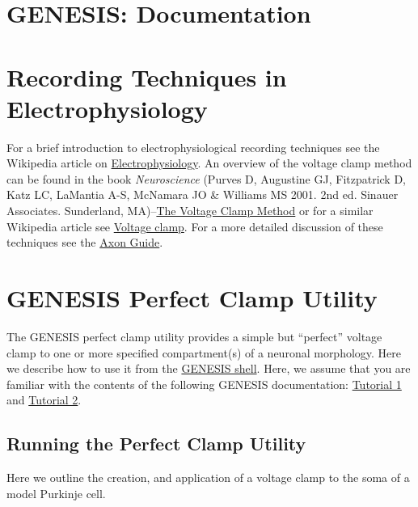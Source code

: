 \documentclass[12pt]{article}
\begin{document}
\section*{GENESIS: Documentation}

\section*{Recording Techniques in Electrophysiology}

For a brief introduction to electrophysiological recording techniques see the Wikipedia article on \href{http://en.wikipedia.org/wiki/Electrophysiology#Current_clamp}{Electrophysiology}. An overview of the voltage clamp method can be found in the book {\it Neuroscience} (Purves D, Augustine GJ,  Fitzpatrick D, Katz LC, LaMantia A-S, McNamara JO \& Williams MS 2001. 2nd ed. Sinauer Associates. Sunderland, MA)--\href{http://www.ncbi.nlm.nih.gov/books/bv.fcgi?rid=neurosci.box.174}{The Voltage Clamp Method} or for a similar Wikipedia article see \href{http://en.wikipedia.org/wiki/Voltage_clamp}{Voltage clamp}. For a more detailed discussion of these techniques see the \href{http://www.moleculardevices.com/pages/instruments/axon_guide.html}{Axon Guide}.

\section*{GENESIS Perfect Clamp Utility}

The GENESIS perfect clamp utility provides a simple but ``perfect'' voltage clamp to one or more specified compartment(s) of a neuronal morphology. Here we describe how to use it from the \href{../gshell/gshell.pdf}{GENESIS shell}. Here, we assume that you are familiar with the contents of the following GENESIS documentation: \href{../tutorial1/tutorial1.pdf}{Tutorial 1} and \href{../tutorial1/tutorial2.pdf}{Tutorial 2}.

\subsection*{Running the Perfect Clamp Utility}

Here we outline the creation, and application of a voltage clamp to the soma of a model Purkinje cell.
\end{document}
